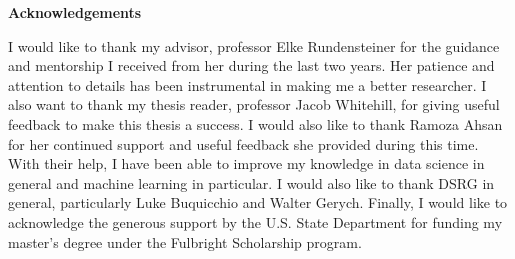 \begin{center}
\textbf{Acknowledgements}
\end{center}
I would like to thank my advisor, professor Elke Rundensteiner for the guidance and mentorship I received from her during the last two years. Her patience and attention to details has been instrumental in making me a better researcher. I also want to thank my thesis reader, professor Jacob Whitehill, for giving useful feedback to make this thesis a success. I would also like to thank Ramoza Ahsan for her continued support and useful feedback she provided during this time. With their help, I have been able to improve my knowledge in data science in general and machine learning in particular. I would also like to thank DSRG in general, particularly Luke Buquicchio and Walter Gerych.  Finally, I would like to acknowledge the generous support by the U.S. State Department for funding my master's degree under the Fulbright Scholarship program.  


\newpage
    
    